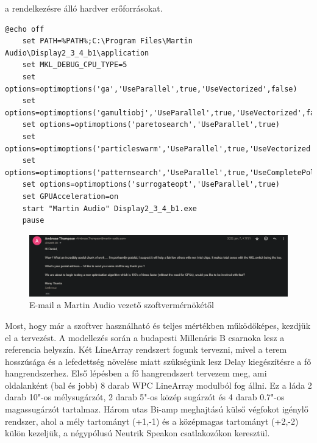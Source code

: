 a rendelkezésre álló hardver erőforrásokat.
\begin{lstlisting}[caption={A Display 2.3.4 b1 indító ".bat" scriptje AMD Ryzen processzorokhoz}, label=batcode, xleftmargin=\parindent]
    @echo off
    set PATH=%PATH%;C:\Program Files\Martin Audio\Display2_3_4_b1\application
    set MKL_DEBUG_CPU_TYPE=5
    set options=optimoptions('ga','UseParallel',true,'UseVectorized',false)
    set options=optimoptions('gamultiobj','UseParallel',true,'UseVectorized',false)
    set options=optimoptions('paretosearch','UseParallel',true)
    set options=optimoptions('particleswarm','UseParallel',true,'UseVectorized',false)
    set options=optimoptions('patternsearch','UseParallel',true,'UseCompletePoll',true,'UseVectorized',false)
    set options=optimoptions('surrogateopt','UseParallel',true)
    set GPUAcceleration=on
    start "Martin Audio" Display2_3_4_b1.exe
    pause
\end{lstlisting}
\begin{figure}[H]
	\centering
	\includegraphics[width=\textwidth, keepaspectratio]{figures/ambrose_email.png}
	\caption{E-mail a Martin Audio vezető szoftvermérnökétől}
	\label{fig:ambrose_email}
\end{figure}
Most, hogy már a szoftver használható és teljes mértékben működőképes, kezdjük el a tervezést.
A modellezés során a budapesti Millenáris B csarnoka lesz a referencia helyszín. Két LineArray rendszert fogunk
tervezni, mivel a terem hosszúsága és a lefedettség növelése miatt szükségünk lesz Delay kiegészítésre a fő hangrendszerhez.
Első lépésben a fő hangrendszert tervezem meg, ami oldalanként (bal és jobb) 8 darab WPC LineArray modulból fog állni.
Ez a láda 2 darab 10"-os mélysugárzót, 2 darab 5"-os közép sugárzót és 4 darab 0.7"-os magassugárzót tartalmaz.
Három utas Bi-amp meghajtású külső végfokot igénylő rendszer, ahol a mély tartományt (+1,-1) és a középmagas tartományt (+2,-2) külön kezeljük,
a négypólusú Neutrik Speakon csatlakozókon keresztül.

